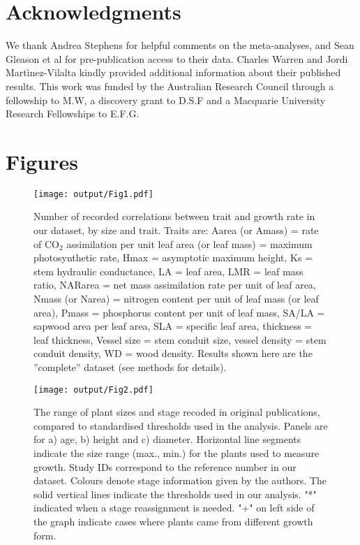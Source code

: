 \documentclass[a4paper,11pt]{article}
\begin{document}
\section*{Acknowledgments}\label{Acknowledgment}

We thank Andrea Stephens for helpful comments on the meta-analyses, and Sean Gleason et al for pre-publication access to their data. Charles Warren and Jordi Martìnez-Vilalta kindly provided additional information about their published results. This work was funded by the Australian Research Council through a fellowship to M.W, a discovery grant to D.S.F and a Macquarie University Research Fellowships to E.F.G.

\clearpage
\linespread{1}

\nocite{*}

\label{references}


\clearpage
\section*{Figures}

\begin{figure}[h!]
\centering
\texttt{[image: output/Fig1.pdf]}
\caption{Number of recorded correlations between trait and growth rate in our dataset, by size and trait. Traits are: Aarea (or Amass) = rate of CO$_{2}$ assimilation per unit leaf area (or leaf mass) = maximum photosynthetic rate, Hmax = asymptotic maximum height,  Ks = stem hydraulic conductance, LA = leaf area, LMR = leaf mass ratio, NARarea = net mass assimilation rate per unit of leaf area, Nmass (or Narea) = nitrogen content per unit of leaf mass (or leaf area), Pmass = phosphorus content per unit of leaf mass, SA/LA = sapwood area per leaf area, SLA = specific leaf area, thickness = leaf thickness, Vessel size = stem conduit size, vessel density = stem conduit density, WD = wood density. Results shown here are the ''complete'' dataset (see methods for details).}
\label{fig:fig1}
\end{figure}

\begin{figure}[h!]
\centering
\texttt{[image: output/Fig2.pdf]}
\caption{The range of plant sizes and stage recoded in original publications, compared to standardised thresholds used in the analysis. Panels are for
a) age, b) height and c) diameter. Horizontal line segments indicate the size range (max., min.) for the plants used to measure growth. Study IDs correspond to the reference number in our dataset. Colours denote stage information given by the authors. The solid vertical lines indicate the thresholds used in our analysis. "*" indicated when a stage reassignment is needed. "+" on left side of the graph indicate cases where plants came from different growth form.}
\label{fig:fig2}
\end{figure}
\end{document}
